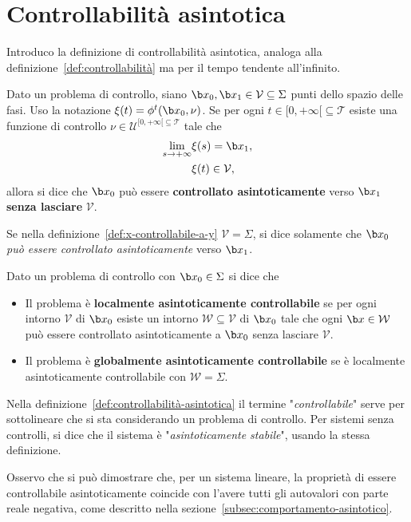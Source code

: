 \section{Controllabilità asintotica}
Introduco la definizione di controllabilità asintotica, analoga alla
definizione~\ref{def:controllabilità} ma per il tempo tendente all'infinito.
\begin{definition}
    Dato un problema di controllo, siano
     $\b x_0, \b x_1 \in \mathcal V \subseteq \Sigma$ punti dello spazio delle fasi.
    Uso la notazione $\xi(t) = \phi^t(\b x_0, \nu)$.
    Se per ogni $t \in[0, +\infty[ \subseteq \mathcal T$
    esiste una funzione di controllo $\nu \in  \mathcal U^{[0, +\infty[ \subseteq \mathcal T}$ tale che
    \begin{align*}
       \lim_{s \to +\infty} &\xi(s) = \b x_1,\\
       &\xi(t) \in \mathcal V,
    \end{align*}
    allora si dice che $\b x_0$ può essere \textbf{controllato asintoticamente} verso
    $\b x_1$ \textbf{senza lasciare} $\mathcal V$.
    \label{def:x-controllabile-a-y}
\end{definition}
Se nella definizione~\ref{def:x-controllabile-a-y} $\mathcal V = \Sigma$,
si dice solamente che
$\b x_0$ \emph{può essere controllato asintoticamente} verso $\b x_1$.
\begin{definition}
    Dato un problema di controllo con $\b x_0 \in \Sigma$ si dice che
    \begin{itemize}
        \item Il problema è \textbf{localmente asintoticamente controllabile}
        se per ogni intorno $\mathcal V$ di $\b x_0$ esiste un intorno
        $\mathcal W \subseteq \mathcal V$ di $\b x_0$ tale che ogni $\b x \in \mathcal W$
        può essere controllato asintoticamente a $\b x_0$ senza lasciare $\mathcal V$.

        \item Il problema è \textbf{globalmente asintoticamente controllabile} se
        è localmente asintoticamente controllabile con $\mathcal W = \Sigma$.
    \end{itemize}
    \label{def:controllabilità-asintotica}
\end{definition}
Nella definizione~\ref{def:controllabilità-asintotica} il termine "\emph{controllabile}"
serve per sottolineare che si sta considerando un problema di controllo.
Per sistemi senza controlli, si dice che il sistema è "\emph{asintoticamente stabile}", usando la
stessa definizione.

Osservo che si può dimostrare che, per un sistema lineare, la proprietà di
essere controllabile asintoticamente coincide con l'avere tutti gli autovalori
con parte reale negativa, come descritto nella sezione~\ref{subsec:comportamento-asintotico}.